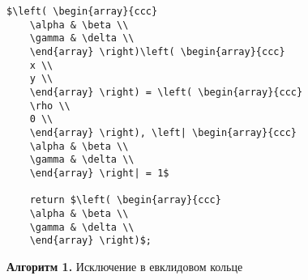 \begin{lstlisting}[mathescape=true]
    $\left( \begin{array}{ccc}
    \alpha & \beta \\
    \gamma & \delta \\
    \end{array} \right)\left( \begin{array}{ccc}
    x \\
    y \\
    \end{array} \right) = \left( \begin{array}{ccc}
    \rho \\
    0 \\
    \end{array} \right), \left| \begin{array}{ccc}
    \alpha & \beta \\
    \gamma & \delta \\
    \end{array} \right| = 1$

    return $\left( \begin{array}{ccc}
    \alpha & \beta \\
    \gamma & \delta \\
    \end{array} \right)$;

\end{lstlisting}
\begin{center}
{\bf Алгоритм 1.} Исключение в евклидовом кольце
\end{center}
